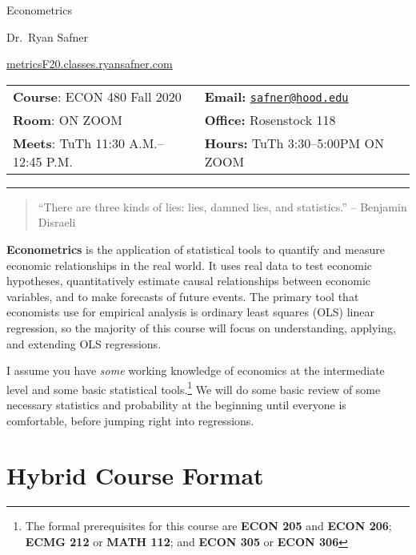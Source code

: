 \documentclass{article}
\begin{document}
\sffamily

\centerline{\Huge Econometrics}

\vspace{3 mm}

\centerline{\large Dr.~Ryan Safner}
\vspace{2 mm}
\centerline{\large \href{http://metricsF20.classes.ryansafner.com}{metricsF20.classes.ryansafner.com}}

\vspace{5 mm}

\begin{tabular}{@{}p{3.5in}p{3.5in}}           
\textbf{Course}: ECON 480 Fall 2020  & \textbf{Email:}  \href{mailto:safner@hood.edu}{\nolinkurl{safner@hood.edu}}\\
\textbf{Room}: ON ZOOM & \textbf{Office:}  Rosenstock 118\\
\textbf{Meets}: TuTh 11:30 A.M.--12:45 P.M. & \textbf{Hours:} TuTh 3:30--5:00PM ON ZOOM\\ 
\end{tabular}

\vspace{5 mm}

\hrule


\begin{quote}
``There are three kinds of lies: lies, damned lies, and statistics.'' --
Benjamin Disraeli
\end{quote}

\textbf{Econometrics} is the application of statistical tools to
quantify and measure economic relationships in the real world. It uses
real data to test economic hypotheses, quantitatively estimate causal
relationships between economic variables, and to make forecasts of
future events. The primary tool that economists use for empirical
analysis is ordinary least squares (OLS) linear regression, so the
majority of this course will focus on understanding, applying, and
extending OLS regressions.

I assume you have \emph{some} working knowledge of economics at the
intermediate level and some basic statistical tools.\footnote{The formal
  prerequisites for this course are \textbf{ECON 205} and \textbf{ECON
  206}; \textbf{ECMG 212} or \textbf{MATH 112}; and \textbf{ECON 305} or
  \textbf{ECON 306}} We will do some basic review of some necessary
statistics and probability at the beginning until everyone is
comfortable, before jumping right into regressions.

\hypertarget{hybrid-course-format}{%
\section*{Hybrid Course Format}\label{hybrid-course-format}}
\end{document}
